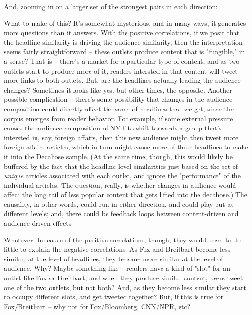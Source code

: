 \documentclass{scrartcl}
\begin{document}
And, zooming in on a larger set of the strongest pairs in each direction:



What to make of this? It's somewhat mysterious, and in many ways, it generates more questions than it answers. With the positive correlations, if we posit that the headline similarity is driving the audience similarity, then the interpretation seems fairly straightforward -- these outlets produce content that is "fungible," in a sense? That is -- there's a market for a particular type of content, and as two outlets start to produce more of it, readers intersted in that content will tweet more links to both outlets. But, are the headlines actually leading the audience changes? Sometimes it looks like yes, but other times, the opposite. Another possible complication -- there's some possibility that changes in the audience composition could directly affect the same of headlines that we get, since the corpus emerges from reader behavior. For example, if some external pressure causes the audience composition of NYT to shift torwards a group that's intersted in, say, foreign affairs, then this new audience might then tweet more foreign affairs articles, which in turn might cause more of these headlines to make it into the Decahose sample. (At the same time, though, this would likely be buffered by the fact that the headline-level similarities just based on the set of \textit{unique} articles associated with each outlet, and ignore the "performance" of the individual articles. The question, really, is whether changes in audience would affect the long tail of less popular content that gets lifted into the decahose.) The causality, in other words, could run in either direction, and could play out at different levels; and, there could be feedback loops between content-driven and audience-driven effects.

Whatever the cause of the positive correlations, though, they would seem to do little to explain the negative correlations. As Fox and Breitbart become less similar, at the level of headlines, they become more similar at the level of audience. Why? Maybe something like -- readers have a kind of "slot" for an outlet like Fox or Breitbart, and when they produce similar content, users tweet one of the two outlets, but not both? And, as they become less similar they start to occupy different slots, and get tweeted together? But, if this is true for Fox/Breitbart -- why not for Fox/Bloomberg, CNN/NPR, etc?
\end{document}
